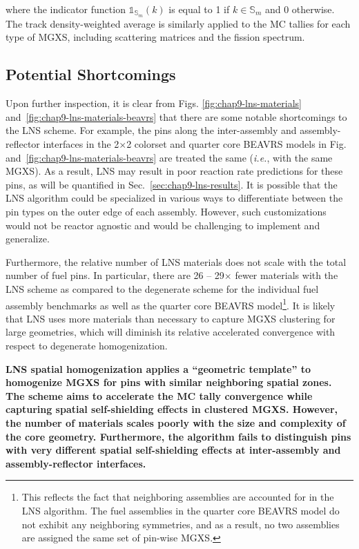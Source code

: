 \noindent where the indicator function $\mathbb{1}_{\mathbb{S}_{m}}(k)$ is equal to 1 if $k \in \mathbb{S}_{m}$ and 0 otherwise. The track density-weighted average is similarly applied to the \ac{MC} tallies for each type of \ac{MGXS}, including scattering matrices and the fission spectrum.

\subsection{Potential Shortcomings}
\label{subsec:chap9-lns-shortcomings}

Upon further inspection, it is clear from Figs. \ref{fig:chap9-lns-materials} and~\ref{fig:chap9-lns-materials-beavrs} that there are some notable shortcomings to the \ac{LNS} scheme. For example, the pins along the inter-assembly and assembly-reflector interfaces in the 2$\times$2 colorset and quarter core \ac{BEAVRS} models in Fig.~ and~\ref{fig:chap9-lns-materials-beavrs} are treated the same (\textit{i.e.}, with the same \ac{MGXS}). As a result, \ac{LNS} may result in poor reaction rate predictions for these pins, as will be quantified in Sec.~\ref{sec:chap9-lns-results}. It is possible that the \ac{LNS} algorithm could be specialized in various ways to differentiate between the pin types on the outer edge of each assembly. However, such customizations would not be reactor agnostic and would be challenging to implement and generalize.

Furthermore, the relative number of \ac{LNS} materials does not scale with the total number of fuel pins. In particular, there are 26 -- 29$\times$ fewer materials with the \ac{LNS} scheme as compared to the degenerate scheme for the individual fuel assembly benchmarks as well as the quarter core \ac{BEAVRS} model\footnote{This reflects the fact that neighboring assemblies are accounted for in the \ac{LNS} algorithm. The fuel assemblies in the quarter core \ac{BEAVRS} model do not exhibit any neighboring symmetries, and as a result, no two assemblies are assigned the same set of pin-wise \ac{MGXS}.}. It is likely that \ac{LNS} uses more materials than necessary to capture \ac{MGXS} clustering for large geometries, which will diminish its relative accelerated convergence with respect to degenerate homogenization.

\begin{emphbox}
\textbf{\ac{LNS} spatial homogenization applies a ``geometric template'' to homogenize \ac{MGXS} for pins with similar neighboring spatial zones. The scheme aims to accelerate the \ac{MC} tally convergence while capturing spatial self-shielding effects in clustered \ac{MGXS}. However, the number of materials scales poorly with the size and complexity of the core geometry. Furthermore, the algorithm fails to distinguish pins with very different spatial self-shielding effects at inter-assembly and assembly-reflector interfaces.}
\end{emphbox}


